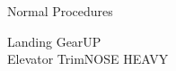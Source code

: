 \documentclass[11pt,twocolumn,letterpaper]{article}
\newcommand*{\protitle}[1]{{\Large\sf#1}} %
\newcommand*{\proitem}[2]{#1\dotfill#2} %
\begin{document}
\begin{center}

	\protitle{Normal Procedures}
	
	\vspace{0.1in}

	\proitem{Landing Gear}{UP}\\
	\proitem{Elevator Trim}{NOSE HEAVY}

\end{center}
\end{document}
